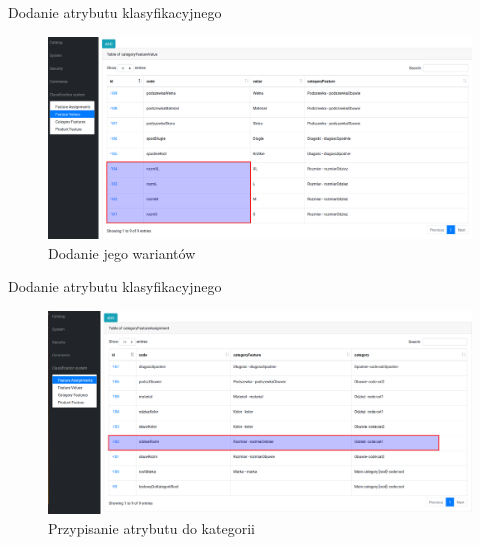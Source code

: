 \documentclass[polish,xcolor=table,9pt,aspectratio=1610,hyperref={pdfpagemode=FullScreen}]{beamer}
\begin{document}
\begin{frame}{Dodanie atrybutu klasyfikacyjnego}
\begin{figure}
	\begin{center}
		\includegraphics[scale=0.2]{11.png}
	\end{center}
	\caption{{\color{black}Dodanie jego wariantów}} 
\end{figure}
\end{frame}

\begin{frame}{Dodanie atrybutu klasyfikacyjnego}
\begin{figure}
	\begin{center}
		\includegraphics[scale=0.2]{12.png}
	\end{center}
	\caption{{\color{black}Przypisanie atrybutu do kategorii}} 
\end{figure}
\end{frame}
\end{document}
